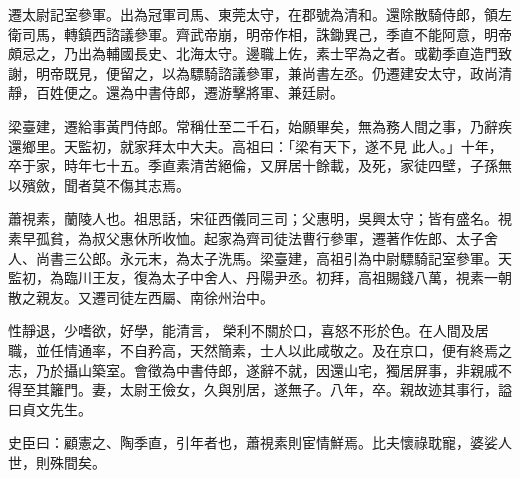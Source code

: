 \begin{pinyinscope}
 遷太尉記室參軍。出為冠軍司馬、東莞太守，在郡號為清和。還除散騎侍郎，領左衛司馬，轉鎮西諮議參軍。齊武帝崩，明帝作相，誅鋤異己，季直不能阿意，明帝頗忌之，乃出為輔國長史、北海太守。邊職上佐，素士罕為之者。或勸季直造門致謝，明帝既見，便留之，以為驃騎諮議參軍，兼尚書左丞。仍遷建安太守，政尚清靜，百姓便之。還為中書侍郎，遷游擊將軍、兼廷尉。



 梁臺建，遷給事黃門侍郎。常稱仕至二千石，始願畢矣，無為務人間之事，乃辭疾還鄉里。天監初，就家拜太中大夫。高祖曰：「梁有天下，遂不見
 此人。」十年，卒于家，時年七十五。季直素清苦絕倫，又屏居十餘載，及死，家徒四壁，子孫無以殯斂，聞者莫不傷其志焉。



 蕭視素，蘭陵人也。祖思話，宋征西儀同三司；父惠明，吳興太守；皆有盛名。視素早孤貧，為叔父惠休所收恤。起家為齊司徒法曹行參軍，遷著作佐郎、太子舍人、尚書三公郎。永元末，為太子洗馬。梁臺建，高祖引為中尉驃騎記室參軍。天監初，為臨川王友，復為太子中舍人、丹陽尹丞。初拜，高祖賜錢八萬，視素一朝散之親友。又遷司徒左西屬、南徐州治中。



 性靜退，少嗜欲，好學，能清言，
 榮利不關於口，喜怒不形於色。在人間及居職，並任情通率，不自矜高，天然簡素，士人以此咸敬之。及在京口，便有終焉之志，乃於攝山築室。會徵為中書侍郎，遂辭不就，因還山宅，獨居屏事，非親戚不得至其籬門。妻，太尉王儉女，久與別居，遂無子。八年，卒。親故迹其事行，謚曰貞文先生。



 史臣曰：顧憲之、陶季直，引年者也，蕭視素則宦情鮮焉。比夫懷祿耽寵，婆娑人世，則殊間矣。



\end{pinyinscope}